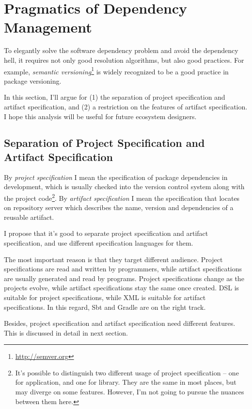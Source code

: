 \section{Pragmatics of Dependency Management}

\label{pragmatics}

To elegantly solve the software dependency problem and avoid the dependency hell, it requires not only good resolution algorithms, but also good practices. For example, \emph{semantic versioning}\footnote{\url{http://semver.org}} is widely recognized to be a good practice in package versioning.

In this section, I'll argue for (1) the separation of project specification and artifact specification, and (2) a restriction on the features of artifact specification. I hope this analysis will be useful for future ecosystem designers.

\subsection{Separation of Project Specification and Artifact Specification}

By \emph{project specification} I mean the specification of package dependencies in development, which is usually checked into the version control system along with the project code\footnote{It's possible to distinguish two different usage of project specification -- one for application, and one for library. They are the same in most places, but may diverge on some features. However, I'm not going to pursue the nuances between them here.}. By \emph{artifact specification} I mean the specification that locates on repository server which describes the name, version and dependencies of a reusable artifact.

I propose that it's good to separate project specification and artifact specification, and use different specification languages for them.

The most important reason is that they target different audience. Project specifications are read and written by programmers, while artifact specifications are usually generated and read by programs. Project specifications change as the projects evolve, while artifact specifications stay the same once created. DSL is suitable for project specifications, while XML is suitable for artifact specifications. In this regard, Sbt and Gradle are on the right track.

Besides, project specification and artifact specification need different features. This is discussed in detail in next section.

